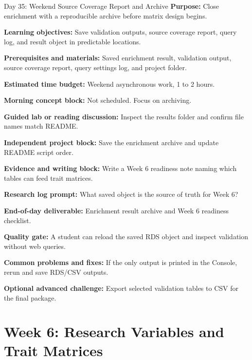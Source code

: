 \begin{dailybox}{Day 35: Weekend Source Coverage Report and Archive}
\textbf{Purpose:} Close enrichment with a reproducible archive before matrix design begins.

\textbf{Learning objectives:} Save validation outputs, source coverage report, query log, and result object in predictable locations.

\textbf{Prerequisites and materials:} Saved enrichment result, validation output, source coverage report, query settings log, and project folder.

\textbf{Estimated time budget:} Weekend asynchronous work, 1 to 2 hours.

\textbf{Morning concept block:} Not scheduled. Focus on archiving.

\textbf{Guided lab or reading discussion:} Inspect the results folder and confirm file names match README.

\textbf{Independent project block:} Save the enrichment archive and update README script order.

\textbf{Evidence and writing block:} Write a Week 6 readiness note naming which tables can feed trait matrices.

\textbf{Research log prompt:} What saved object is the source of truth for Week 6?

\textbf{End-of-day deliverable:} Enrichment result archive and Week 6 readiness checklist.

\textbf{Quality gate:} A student can reload the saved RDS object and inspect validation without web queries.

\textbf{Common problems and fixes:} If the only output is printed in the Console, rerun and save RDS/CSV outputs.

\textbf{Optional advanced challenge:} Export selected validation tables to CSV for the final package.
\end{dailybox}

\section{Week 6: Research Variables and Trait Matrices}

